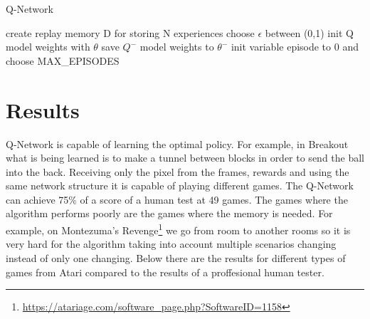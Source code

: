 \begin{algorithm}
	\caption{Q-Network} \label{sgd-code}
	\begin{algorithmic}[1]
		\State create replay memory D for storing N experiences
		\State choose $\epsilon$ between (0,1)
		\State init Q model weights with $\theta$
		\State save $Q^-$ model weights to $\theta^-$
		\State init variable episode to 0 and choose MAX_EPISODES
		\EndWhile

		
	\end{algorithmic}
\end{algorithm}

\newpage


\section{Results}

Q-Network is capable of learning the optimal policy. For example, in Breakout what is being learned is to make a tunnel between blocks in order to send the ball into the back. Receiving only the pixel from the frames, rewards and using the same network structure it is capable of playing different games. The Q-Network can achieve 75\% of a score of a human test at 49 games\cite{nature}. The games where the algorithm performs poorly are the games where the memory is needed. For example, on Montezuma's Revenge\footnote{\url{https://atariage.com/software_page.php?SoftwareID=1158}} we go from room to another rooms so it is very hard for the algorithm taking into account multiple scenarios changing instead of only one changing. Below there are the results for different types of games from Atari compared to the results of a proffesional human tester.


